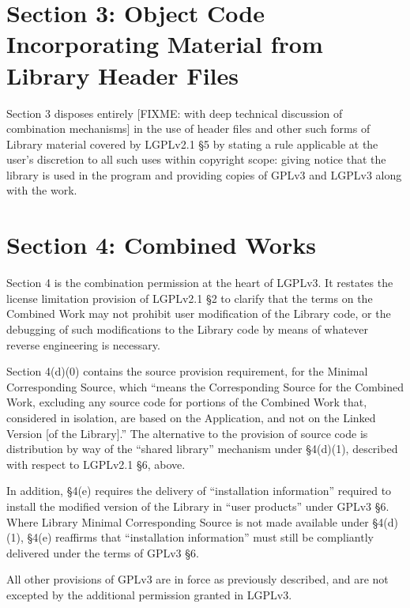 \section{Section 3: Object Code Incorporating Material from Library Header Files}

Section 3 disposes entirely [FIXME: with deep technical discussion of
  combination mechanisms]  in the use of header files and other such forms of
Library material covered by LGPLv2.1 \S5 by stating a rule applicable at the
user’s discretion to all such uses within copyright scope: giving notice that
the library is used in the program and providing copies of GPLv3 and LGPLv3
along with the work.

\section{ Section 4: Combined Works}

Section 4 is the combination permission at the heart of LGPLv3. It restates
the license limitation provision of LGPLv2.1 \S2 to clarify that the terms on
the Combined Work may not prohibit user modification of the Library code, or
the debugging of such modifications to the Library code by means of whatever
reverse engineering is necessary.

Section 4(d)(0) contains the source provision requirement, for the Minimal
Corresponding Source, which ``means the Corresponding Source for the Combined
Work, excluding any source code for portions of the Combined Work that,
considered in isolation, are based on the Application, and not on the Linked
Version [of the Library].'' The alternative to the provision of source code is
distribution by way of the ``shared library'' mechanism under \S4(d)(1),
described with respect to LGPLv2.1 \S6, above.

In addition, \S4(e) requires the delivery of ``installation information''
required to install the modified version of the Library in ``user products''
under GPLv3 \S6. Where Library Minimal Corresponding Source is not made
available under \S4(d)(1), \S4(e) reaffirms that ``installation information''
must still be compliantly delivered under the terms of GPLv3 \S6.

All other provisions of GPLv3 are in force as previously described, and are
not excepted by the additional permission granted in LGPLv3.


